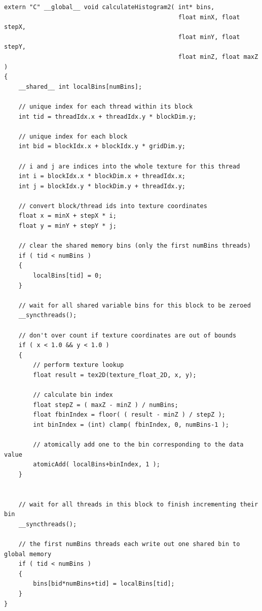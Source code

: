 \documentclass{article}
\begin{document}
\lstset{language=C,basicstyle=\footnotesize}
\begin{minipage}{\textwidth}
\begin{lstlisting}[caption={Shared Memory atomicAdd kernel},label={kernel2}]
extern "C" __global__ void calculateHistogram2( int* bins,
                                                float minX, float stepX,
                                                float minY, float stepY,
                                                float minZ, float maxZ )
{
    __shared__ int localBins[numBins];

    // unique index for each thread within its block
    int tid = threadIdx.x + threadIdx.y * blockDim.y;

    // unique index for each block
    int bid = blockIdx.x + blockIdx.y * gridDim.y;

    // i and j are indices into the whole texture for this thread
    int i = blockIdx.x * blockDim.x + threadIdx.x;
    int j = blockIdx.y * blockDim.y + threadIdx.y;

    // convert block/thread ids into texture coordinates
    float x = minX + stepX * i;
    float y = minY + stepY * j;

    // clear the shared memory bins (only the first numBins threads)
    if ( tid < numBins )
    {
        localBins[tid] = 0;
    }

    // wait for all shared variable bins for this block to be zeroed
    __syncthreads();

    // don't over count if texture coordinates are out of bounds
    if ( x < 1.0 && y < 1.0 )
    {
        // perform texture lookup
        float result = tex2D(texture_float_2D, x, y);
    
        // calculate bin index
        float stepZ = ( maxZ - minZ ) / numBins;
        float fbinIndex = floor( ( result - minZ ) / stepZ );
        int binIndex = (int) clamp( fbinIndex, 0, numBins-1 );
    
        // atomically add one to the bin corresponding to the data value
        atomicAdd( localBins+binIndex, 1 );
    }


    // wait for all threads in this block to finish incrementing their bin
    __syncthreads();

    // the first numBins threads each write out one shared bin to global memory
    if ( tid < numBins )
    {
        bins[bid*numBins+tid] = localBins[tid];
    }
}
\end{lstlisting}
\end{minipage}
\end{document}
